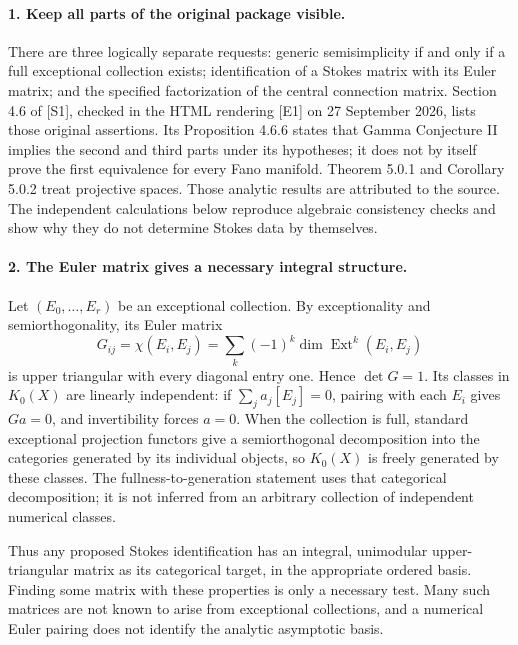\documentclass[11pt]{article}
\begin{document}
\paragraph{1. Keep all parts of the original package visible.}
There are three logically separate requests: generic semisimplicity if and only if a full exceptional collection exists; identification of a Stokes matrix with its Euler matrix; and the specified factorization of the central connection matrix. Section 4.6 of [S1], checked in the HTML rendering [E1] on 27 September 2026, lists those original assertions. Its Proposition 4.6.6 states that Gamma Conjecture II implies the second and third parts under its hypotheses; it does not by itself prove the first equivalence for every Fano manifold. Theorem 5.0.1 and Corollary 5.0.2 treat projective spaces. Those analytic results are attributed to the source. The independent calculations below reproduce algebraic consistency checks and show why they do not determine Stokes data by themselves.

\paragraph{2. The Euler matrix gives a necessary integral structure.}
Let $(E_0,\ldots,E_r)$ be an exceptional collection. By exceptionality and semiorthogonality, its Euler matrix
\[
 G_{ij}=\chi(E_i,E_j)=\sum_k(-1)^k\dim\operatorname{Ext}^k(E_i,E_j)
\]
is upper triangular with every diagonal entry one. Hence $\det G=1$. Its classes in $K_0(X)$ are linearly independent: if $\sum_j a_j[E_j]=0$, pairing with each $E_i$ gives $Ga=0$, and invertibility forces $a=0$. When the collection is full, standard exceptional projection functors give a semiorthogonal decomposition into the categories generated by its individual objects, so $K_0(X)$ is freely generated by these classes. The fullness-to-generation statement uses that categorical decomposition; it is not inferred from an arbitrary collection of independent numerical classes.

Thus any proposed Stokes identification has an integral, unimodular upper-triangular matrix as its categorical target, in the appropriate ordered basis. Finding some matrix with these properties is only a necessary test. Many such matrices are not known to arise from exceptional collections, and a numerical Euler pairing does not identify the analytic asymptotic basis.
\end{document}
